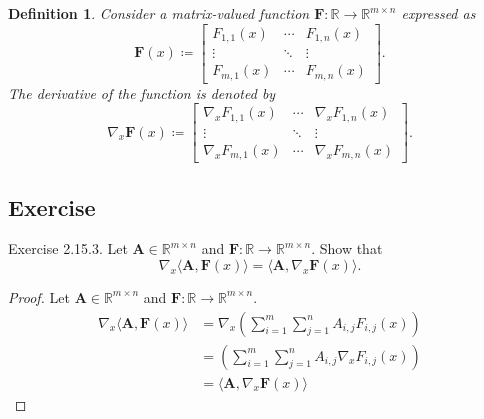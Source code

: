 \documentclass{article}
\theoremstyle{plain}
\newtheorem{dfn}{Definition}[subsection]
\begin{document}
\begin{dfn}
	Consider a matrix-valued function $\bm{F}:\mathbb{R} \rightarrow \mathbb{R}^{m \times n}$
	expressed as
	\begin{equation*}
		\bm{F}(x) \coloneq
		\begin{bmatrix}
			F_{1,1}(x) & \cdots & F_{1,n}(x) \\
			\vdots & \ddots & \vdots \\
			F_{m,1}(x) & \cdots & F_{m,n}(x)
		\end{bmatrix} .
	\end{equation*}
	The derivative of the function is denoted by
	\begin{equation*}
		\nabla_{x} \bm{F}(x) \coloneq
		\begin{bmatrix}
			\nabla_x F_{1,1}(x) & \cdots & \nabla_x F_{1,n}(x) \\
			\vdots & \ddots & \vdots \\
			\nabla_x F_{m,1}(x) & \cdots & \nabla_x F_{m,n}(x)
		\end{bmatrix} .
	\end{equation*}
\end{dfn}


\subsection{Exercise}


\begin{itembox}[l]{Exercise 2.15.3.}
	Let
	\begin{math}
		\bm{A} \in \mathbb{R}^{m \times n}
	\end{math}
	and
	\begin{math}
		\bm{F}:\mathbb{R} \rightarrow \mathbb{R}^{m \times n} .
	\end{math}
	Show that
	\begin{equation}
		\nabla_x \langle \bm{A} , \bm{F}(x) \rangle = \langle \bm{A} , \nabla_x \bm{F}(x) \rangle .
	\end{equation}
\end{itembox}


\begin{proof}
	Let
	\begin{math}
		\bm{A} \in \mathbb{R}^{m \times n}
	\end{math}
	and
	\begin{math}
		\bm{F}:\mathbb{R} \rightarrow \mathbb{R}^{m \times n} .
	\end{math}
	\begin{equation*}
		\begin{split}
			\nabla_x \langle \bm{A} , \bm{F}(x) \rangle &= \nabla_x \left( \sum_{i=1}^m \sum_{j=1}^n A_{i,j} F_{i,j}(x) \right) \\
			&= \left( \sum_{i=1}^m \sum_{j=1}^n A_{i,j} \nabla_x  F_{i,j}(x) \right) \\
			&= \langle \bm{A} , \nabla_x \bm{F}(x) \rangle
		\end{split}
	\end{equation*}
\end{proof}
\end{document}
